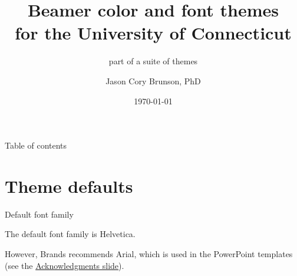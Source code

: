 \documentclass{beamer}
\title[Beamer colors and fonts for UConn]{Beamer color and font themes\\ for the University of Connecticut}
\subtitle{part of a suite of themes}
\author[Cory Brunson]{Jason Cory Brunson, PhD}
\institute[UConn Health]{Center for Quantitative Medicine\\ University of Connecticut School of Medicine}
\date{\today}
\begin{document}
\begin{frame}
\titlepage
\end{frame}


\begin{frame}{Table of contents}
\tableofcontents
\end{frame}


\section{Theme defaults}

\begin{frame}{Default font family}

The default font family is Helvetica.

\vfill
However, Brands recommends Arial, which is used in the PowerPoint templates (see the \hyperlink{slide:acknowledgments}{Acknowledgments slide}).

\end{frame}
\end{document}
